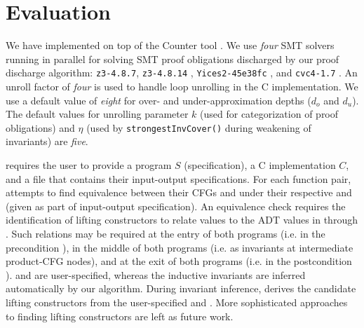 \chapter{Evaluation}
\label{sec:eval}
\vspace{-10px}
We have implemented \toolName{} on top of the Counter tool \cite{oopsla20}.
We use {\em four} SMT solvers running in parallel for solving
SMT proof obligations discharged by our proof discharge algorithm:
{\tt z3-4.8.7}, {\tt z3-4.8.14} \cite{z3}, {\tt Yices2-45e38fc} \cite{yices}, and {\tt cvc4-1.7} \cite{cvc4solver}.
An unroll factor of {\em four} is used to handle loop unrolling in the C implementation.
We use a default value of {\em eight} for over- and under-approximation depths ($d_o$ and $d_u$).
The default values for unrolling parameter $k$ (used for categorization of proof obligations)
and $\eta$ (used by {\tt strongestInvCover()} during weakening of \recursiveRelation{} invariants) are {\em five}.

\toolName{} requires the user to provide a \SpecL{} program $S$ (specification), a C implementation $C$,
and a file that contains their input-output specifications.
For each function pair, \toolName{} attempts to find equivalence between their CFGs \sprog{} and \cprog{}
under their respective \pre{} and \post{} (given as part of input-output specification).
An equivalence check requires the identification of lifting constructors to relate \cprog{}
values to the ADT values in \sprog{} through  \recursiveRelations{}.
Such relations may be required at the entry of both programs (i.e. in the precondition \pre{}),
in the middle of both programs (i.e. as invariants at intermediate product-CFG nodes),
and at the exit of both programs (i.e. in the postcondition \post{}).
\pre{} and \post{} are user-specified, whereas the inductive invariants are
inferred automatically by our algorithm.
During invariant inference, \toolName{} derives the candidate lifting constructors
from the user-specified \pre{} and \post{}.
More sophisticated approaches to finding lifting constructors are left as future work.


